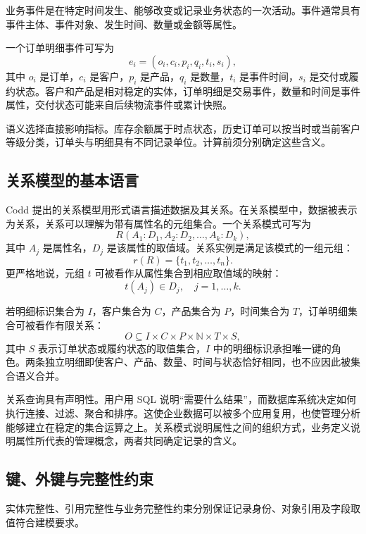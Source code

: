 \begin{definition}[业务事件]
业务事件是在特定时间发生、能够改变或记录业务状态的一次活动。事件通常具有事件主体、事件对象、发生时间、数量或金额等属性。
\end{definition}

一个订单明细事件可写为
\[
e_i=(o_i,c_i,p_i,q_i,t_i,s_i),
\]
其中 \(o_i\) 是订单，\(c_i\) 是客户，\(p_i\) 是产品，\(q_i\) 是数量，\(t_i\) 是事件时间，\(s_i\) 是交付或履约状态。客户和产品是相对稳定的实体，订单明细是交易事件，数量和时间是事件属性，交付状态可能来自后续物流事件或累计快照。

语义选择直接影响指标。库存余额属于时点状态，历史订单可以按当时或当前客户等级分类，订单头与明细具有不同记录单位。计算前须分别确定这些含义。

\subsection{关系模型的基本语言}

Codd 提出的关系模型用形式语言描述数据及其关系。在关系模型中，数据被表示为关系，关系可以理解为带有属性名的元组集合。一个关系模式可写为
\[
R(A_1:D_1,A_2:D_2,\ldots,A_k:D_k),
\]
其中 \(A_j\) 是属性名，\(D_j\) 是该属性的取值域。关系实例是满足该模式的一组元组：
\[
r(R)=\{t_1,t_2,\ldots,t_n\}.
\]
更严格地说，元组 \(t\) 可被看作从属性集合到相应取值域的映射：
\[
t(A_j)\in D_j,\quad j=1,\ldots,k.
\]

若明细标识集合为 \(I\)，客户集合为 \(C\)，产品集合为 \(P\)，时间集合为 \(T\)，订单明细集合可被看作有限关系：
\[
O \subseteq I\times C\times P\times \mathbb N\times T\times S,
\]
其中 \(S\) 表示订单状态或履约状态的取值集合，\(I\) 中的明细标识承担唯一键的角色。两条独立明细即使客户、产品、数量、时间与状态恰好相同，也不应因此被集合语义合并。

关系查询具有声明性。用户用 SQL 说明“需要什么结果”，而数据库系统决定如何执行连接、过滤、聚合和排序。这使企业数据可以被多个应用复用，也使管理分析能够建立在稳定的集合运算之上。关系模式说明属性之间的组织方式，业务定义说明属性所代表的管理概念，两者共同确定记录的含义。

\subsection{键、外键与完整性约束}

实体完整性、引用完整性与业务完整性约束分别保证记录身份、对象引用及字段取值符合建模要求。

